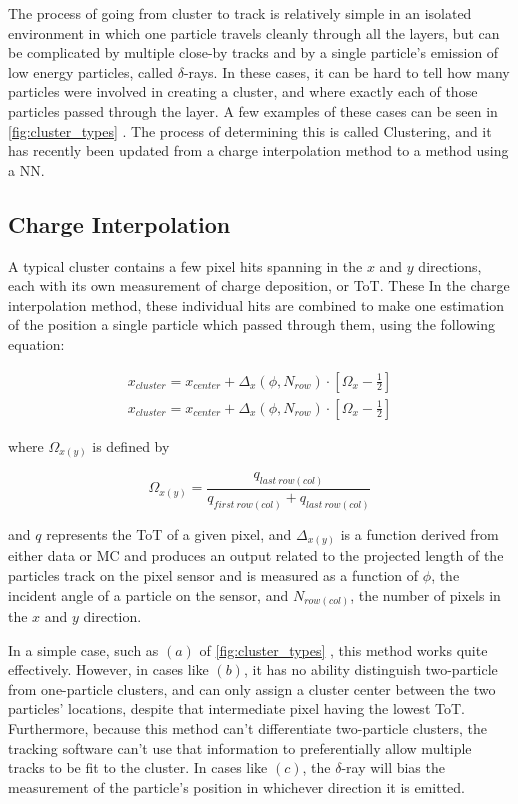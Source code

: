 The process of going from cluster to track is relatively simple in an isolated environment in which one particle travels cleanly through all the layers, but can be complicated by multiple close-by tracks and by a single particle's emission of low energy particles, called $\delta$-rays. In these cases, it can be hard to tell how many particles were involved in creating a cluster, and where exactly each of those particles passed through the layer. A few examples of these cases can be seen in \autoref{fig:cluster_types} . The process of determining this is called Clustering, and it has recently been updated from a charge interpolation method to a method using a \ac{NN}. 

\subsection{Charge Interpolation}

A typical cluster contains a few pixel hits spanning in the $x$ and $y$ directions, each with its own measurement of charge deposition, or \ac{ToT}. These In the charge interpolation method, these individual hits are combined to make one estimation of the position a single particle which passed through them, using the following equation: 

\begin{eqnarray}
x_{cluster} = x_{center} + \Delta_x(\phi,N_{row}) \cdot \left[ \Omega_x -\frac{1}{2} \right] \\
\label{eq:analogx}
x_{cluster} = x_{center} + \Delta_x(\phi,N_{row}) \cdot \left[ \Omega_x -\frac{1}{2} \right]
\label{eq:analogy}
\end{eqnarray}

where $\Omega_{x(y)}$ is defined by

\begin{equation}
\Omega_{x(y)} = \frac{q_{last~row(col)}}{q_{first~row(col)} + q_{last~row(col)}}
\end{equation}

and $q$ represents the \ac{ToT} of a given pixel, and $\Delta_{x(y)}$ is a function derived from either data or \ac{MC} and produces an output related to the projected length of the particles track on the pixel sensor and is measured as a function of $\phi$, the incident angle of a particle on the sensor, and $N_{row(col)}$, the number of pixels in the $x$ and $y$ direction. 

In a simple case, such as $(a)$ of \autoref{fig:cluster_types} , this method works quite effectively. However, in cases like $(b)$, it has no ability distinguish two-particle from one-particle clusters, and can only assign a cluster center between the two particles' locations, despite that intermediate pixel having the lowest \ac{ToT}. Furthermore, because this method can't differentiate two-particle clusters, the tracking software can't use that information to preferentially allow multiple tracks to be fit to the cluster. In cases like $(c)$, the $\delta$-ray will bias the measurement of the particle's position in whichever direction it is emitted. 

